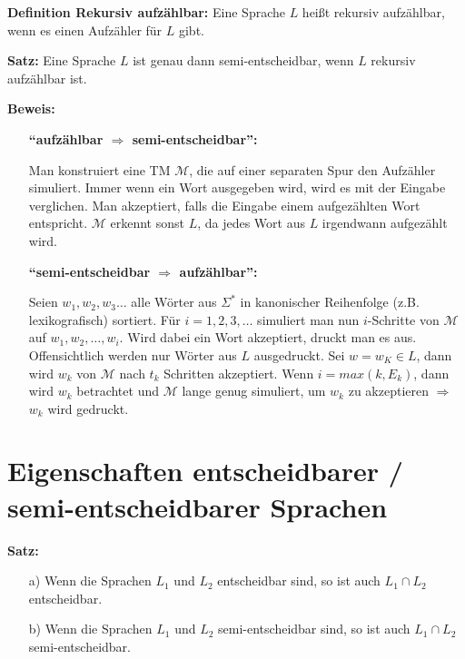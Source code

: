 \documentclass{scrartcl}%
\begin{document}
    \vspace*{0.3cm}
    \textbf{\textsf{Definition Rekursiv aufzählbar:}}
    Eine Sprache $L$ heißt rekursiv aufzählbar, wenn es einen Aufzähler für $L$ gibt.

    \vspace*{0.3cm}
    \textbf{\textsf{Satz:}}
    Eine Sprache $L$ ist genau dann semi-entscheidbar, wenn $L$ rekursiv aufzählbar ist.

    \vspace*{0.3cm}
    \textbf{\textsf{Beweis:}}
    \begin{itemize}
        \item [] \textbf{"`aufzählbar $\Rightarrow$ semi-entscheidbar"':}
        \item [] Man konstruiert eine TM $\mathcal{M}$, die auf einer separaten Spur den Aufzähler simuliert.
        Immer wenn ein Wort ausgegeben wird, wird es mit der Eingabe verglichen.
        Man akzeptiert, falls die Eingabe einem aufgezählten Wort entspricht.
        $\mathcal{M}$ erkennt sonst $L$, da jedes Wort aus $L$ irgendwann aufgezählt wird.
        \item [] \textbf{"`semi-entscheidbar $\Rightarrow$ aufzählbar"':}
        \item [] Seien $w_1, w_2, w_3 \dots$ alle Wörter aus $\Sigma^*$ in kanonischer Reihenfolge (z.B. lexikografisch) sortiert.
        Für $i = 1,2,3, \dots$ simuliert man nun $i$-Schritte von $\mathcal{M}$ auf $w_1, w_2, \dots, w_i$.
        Wird dabei ein Wort akzeptiert, druckt man es aus.
        Offensichtlich werden nur Wörter aus $L$ ausgedruckt.
        Sei $w=w_K \in L$, dann wird $w_k$ von $\mathcal{M}$ nach $t_k$ Schritten akzeptiert.
        Wenn $i = max(k, E_k)$, dann wird $w_k$ betrachtet und $\mathcal{M}$ lange genug simuliert, um $w_k$ zu akzeptieren
        $\Rightarrow$ $w_k$ wird gedruckt.\proofend
    \end{itemize}

    \section*{Eigenschaften entscheidbarer / semi-entscheidbarer Sprachen}
    \textbf{\textsf{Satz:}}
    \begin{itemize}
        \item [a)] Wenn die Sprachen $L_1$ und $L_2$ entscheidbar sind, so ist auch $L_1 \cap L_2$ entscheidbar.
        \item [b)] Wenn die Sprachen $L_1$ und $L_2$ semi-entscheidbar sind, so ist auch $L_1 \cap L_2$ semi-entscheidbar.
    \end{itemize}
\end{document}
